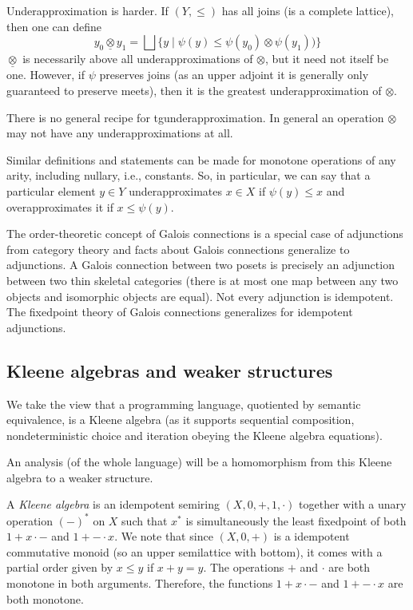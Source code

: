 \documentclass{llncs}
\newcommand{\bigjoin}{\bigsqcup}
\begin{document}
Underapproximation is harder. If $(Y, \leq)$ has all joins (is a
complete lattice), then one can define
\[
y_0 \mathbin{\underline{\otimes}} y_1 = \bigjoin \{ y \mid \psi(y) \leq \psi(y_0) \otimes \psi(y_1))\} 
\]
$\underline{\otimes}$ is necessarily above all underapproximations of
$\otimes$, but it need not itself be one. However, if $\psi$ preserves
joins (as an upper adjoint it is generally only guaranteed to preserve
meets), then it is the greatest underapproximation of $\otimes$.

There is no general recipe for tgunderapproximation. In general an
operation $\otimes$ may not have any underapproximations at all.

Similar definitions and statements can be made for monotone operations
of any arity, including nullary, i.e., constants.  So, in particular,
we can say that a particular element $y \in Y$ underapproximates
$x \in X$ if $\psi(y) \leq x$ and overapproximates it if
$x \leq \psi(y)$.

The order-theoretic concept of Galois connections is a special case of
adjunctions from category theory and facts about Galois connections
generalize to adjunctions. A Galois connection between two posets is
precisely an adjunction between two thin skeletal categories (there is
at most one map between any two objects and isomorphic objects are
equal). Not every adjunction is idempotent. The fixedpoint theory of
Galois connections generalizes for idempotent adjunctions.


\subsection{Kleene algebras and weaker structures}

We take the view that a programming language, quotiented by semantic
equivalence, is a Kleene algebra (as it supports sequential
composition, nondeterministic choice and iteration obeying the Kleene
algebra equations).

An analysis (of the whole language) will be a homomorphism from this
Kleene algebra to a weaker structure.

A \emph{Kleene algebra} is an idempotent semiring
$(X, 0, {+},1, {\cdot})$ together with a unary operation $(-)^*$ on
$X$ such that $x^*$ is simultaneously the least fixedpoint of both
$1 + x \cdot {-}$ and $1 + {-} \cdot x$.  We note that since
$(X, 0, {+})$ is a idempotent commutative monoid (so an upper
semilattice with bottom), it comes with a partial order given by
$x \leq y$ if $x + y = y$. The operations $+$ and $\cdot$ are both
monotone in both arguments. Therefore, the functions $1 + x \cdot {-}$
and $1 + {-} \cdot x$ are both monotone.
\end{document}
